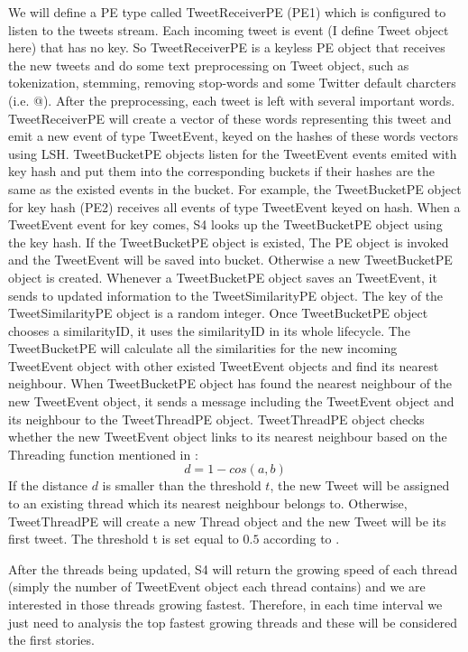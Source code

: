\documentclass[a4paper,12pt]{article}
\begin{document}
We will define a PE type called TweetReceiverPE (PE1) which is configured to listen to the tweets stream. Each incoming tweet is event (I define Tweet object here) that has no key. So TweetReceiverPE is a keyless PE object that receives the new tweets and do some text preprocessing on Tweet object, such as tokenization, stemming, removing stop-words and some Twitter default charcters (i.e. @). After the preprocessing, each tweet is left with several important words. TweetReceiverPE will create a vector of these words representing this tweet and emit a new event of type TweetEvent, keyed on the hashes of these words vectors using LSH. TweetBucketPE objects listen for the TweetEvent events emited with key hash and put them into the corresponding buckets if their hashes are the same as the existed events in the bucket. For example, the TweetBucketPE object for key hash (PE2) receives all events of type TweetEvent keyed on hash. When a TweetEvent event for key comes, S4 looks up the TweetBucketPE object using the key hash. If the TweetBucketPE object is existed, The PE object is invoked and the TweetEvent will be saved into bucket. Otherwise a new TweetBucketPE object is created. Whenever a TweetBucketPE object saves an TweetEvent, it sends to updated information to the TweetSimilarityPE object. The key of the TweetSimilarityPE object is a random integer. Once TweetBucketPE object chooses a similarityID, it uses the similarityID in its whole lifecycle. The TweetBucketPE will calculate all the similarities for the new incoming TweetEvent object with other existed TweetEvent objects and find its nearest neighbour. When TweetBucketPE object has found the nearest neighbour of the new TweetEvent object, it sends a message including the TweetEvent object and its neighbour to the TweetThreadPE object. TweetThreadPE object checks whether the new TweetEvent object links to its nearest neighbour based on the Threading function mentioned in \cite{Petrovic:2010}: $$d=1-cos(a,b)$$
If the distance $d$ is smaller than the threshold $t$, the new Tweet will be assigned to an existing thread which its nearest neighbour belongs to. Otherwise, TweetThreadPE will create a new Thread object and the new Tweet will be its first tweet. The threshold t is set equal to $0.5$ according to \cite{Petrovic:2010}. \newline

	After the threads being updated, S4 will return the growing speed of each thread (simply the number of TweetEvent object each thread contains) and we are interested in those threads growing fastest. Therefore, in each time interval we just need to analysis the top fastest growing threads and these will be considered the first stories. 
\end{document}
